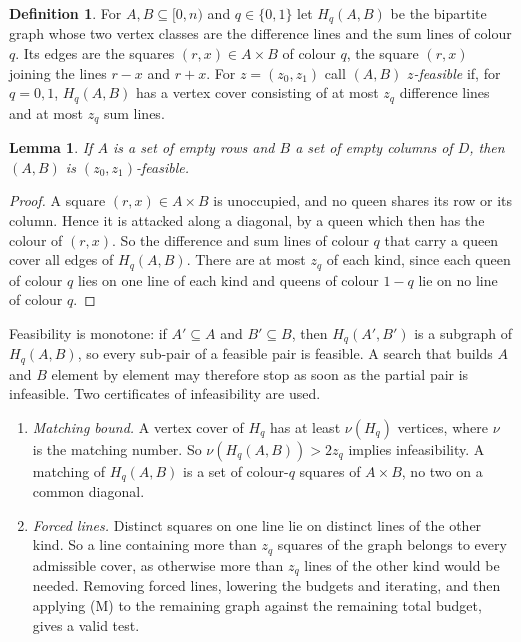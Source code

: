 \documentclass[11pt]{article}
\newtheorem{lemma}[theorem]{Lemma}
\theoremstyle{definition}
\newtheorem{definition}[theorem]{Definition}
\theoremstyle{remark}
\begin{document}
\begin{definition}
For $A,B\subseteq[0,n)$ and $q\in\{0,1\}$ let $H_q(A,B)$ be the bipartite graph whose two vertex classes
are the difference lines and the sum lines of colour $q$. Its edges are the squares $(r,x)\in A\times B$
of colour $q$, the square $(r,x)$ joining the lines $r-x$ and $r+x$. For $z=(z_0,z_1)$ call $(A,B)$
\emph{$z$-feasible} if, for $q=0,1$, $H_q(A,B)$ has a vertex cover consisting of at most $z_q$
difference lines and at most $z_q$ sum lines.
\end{definition}

\begin{lemma}\label{lem:relax}
If $A$ is a set of empty rows and $B$ a set of empty columns of $D$, then $(A,B)$ is $(z_0,z_1)$-feasible.
\end{lemma}
\begin{proof}
A square $(r,x)\in A\times B$ is unoccupied, and no queen shares its row or its column. Hence it is
attacked along a diagonal, by a queen which then has the colour of $(r,x)$. So the difference and sum
lines of colour $q$ that carry a queen cover all edges of $H_q(A,B)$. There are at most $z_q$ of each
kind, since each queen of colour $q$ lies on one line of each kind and queens of colour $1-q$ lie on no
line of colour $q$.
\end{proof}

Feasibility is monotone: if $A'\subseteq A$ and $B'\subseteq B$, then $H_q(A',B')$ is a subgraph of
$H_q(A,B)$, so every sub-pair of a feasible pair is feasible. A search that builds $A$ and $B$ element by
element may therefore stop as soon as the partial pair is infeasible. Two certificates of
infeasibility are used.
\begin{enumerate}
\item[(M)] \emph{Matching bound.} A vertex cover of $H_q$ has at least $\nu(H_q)$ vertices, where $\nu$
is the matching number. So $\nu(H_q(A,B))>2z_q$ implies infeasibility. A matching of $H_q(A,B)$ is a set
of colour-$q$ squares of $A\times B$, no two on a common diagonal.
\item[(K)] \emph{Forced lines.} Distinct squares on one line lie on distinct lines of the other kind.
So a line containing more than $z_q$ squares of the graph belongs to every admissible cover, as
otherwise more than $z_q$ lines of the other kind would be needed. Removing forced lines, lowering the
budgets and iterating, and then applying (M) to the remaining graph against the remaining total budget,
gives a valid test.
\end{enumerate}
\end{document}
